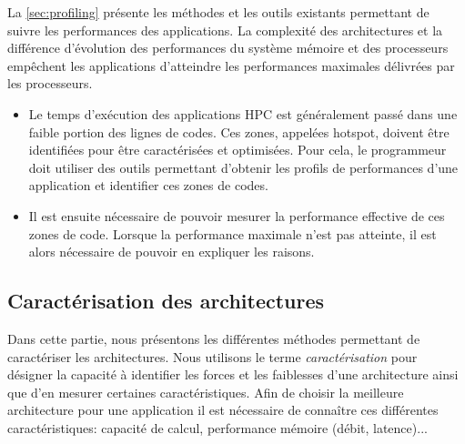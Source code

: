     La \autoref{sec:profiling} présente les méthodes et les outils existants permettant de suivre les performances des applications. La complexité des architectures et la différence d'évolution des performances du système mémoire et des processeurs empêchent les applications d'atteindre les performances maximales délivrées par les processeurs. 
    \begin{itemize}
        \item Le temps d'exécution des applications HPC est généralement passé dans une faible portion des lignes de codes. Ces zones, appelées \gls{hotspot}, doivent être identifiées pour être caractérisées et optimisées. Pour cela, le programmeur doit utiliser des outils permettant d'obtenir les profils de performances d'une application et identifier ces zones de codes.
        
        \item Il est ensuite nécessaire de pouvoir mesurer la performance effective de ces zones de code. Lorsque la performance maximale n'est pas atteinte, il est alors nécessaire de pouvoir en expliquer les raisons. 
    \end{itemize}
    
      
\subsection{Caractérisation des architectures}\label{sec:caracterisation}
    
    Dans cette partie, nous présentons les différentes méthodes permettant de caractériser les architectures. Nous utilisons le terme \textit{caractérisation} pour désigner la capacité à identifier les forces et les faiblesses d'une architecture ainsi que d'en mesurer certaines caractéristiques. Afin de choisir la meilleure architecture pour une application il est nécessaire de connaître ces différentes caractéristiques: capacité de calcul, performance mémoire (débit, latence)...
    
